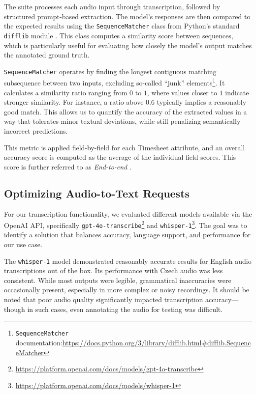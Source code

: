 \documentclass[
  digital,     %
  oneside,     %
  nosansbold,  %
  nocolorbold, %
  lof,         %
  lot,         %
]{fithesis4}
\begin{document}
The suite processes each audio input through transcription, followed by structured prompt-based extraction. The model's responses are then compared to the expected results using the \texttt{SequenceMatcher} class from Python’s standard \texttt{difflib} module \cite{pythonDifflib}. This class computes a similarity score between sequences, which is particularly useful for evaluating how closely the model's output matches the annotated ground truth.

\texttt{SequenceMatcher} operates by finding the longest contiguous matching subsequence between two inputs, excluding so-called ``junk'' elements\footnote{\texttt{SequenceMatcher} documentation:\newline\url{https://docs.python.org/3/library/difflib.html\#difflib.SequenceMatcher}}. It calculates a similarity ratio ranging from $0$ to $1$, where values closer to $1$ indicate stronger similarity. For instance, a ratio above $0.6$ typically implies a reasonably good match. This allows us to quantify the accuracy of the extracted values in a way that tolerates minor textual deviations, while still penalizing semantically incorrect predictions.

This metric is applied field-by-field for each Timesheet attribute, and an overall accuracy score is computed as the average of the individual field scores. This score is further referred to as \emph{End-to-end }.

\subsection{Optimizing Audio-to-Text Requests}
For our transcription functionality, we evaluated different models available via the OpenAI \gls{API}, specifically \texttt{gpt-4o-transcribe}\footnote{\url{https://platform.openai.com/docs/models/gpt-4o-transcribe}} and \texttt{whisper-1}\footnote{\url{https://platform.openai.com/docs/models/whisper-1}}. The goal was to identify a solution that balances accuracy, language support, and performance for our use case.

The \texttt{whisper-1} model demonstrated reasonably accurate results for English audio transcriptions out of the box. Its performance with Czech audio was less consistent. While most outputs were legible, grammatical inaccuracies were occasionally present, especially in more complex or noisy recordings. It should be noted that poor audio quality significantly impacted transcription accuracy—though in such cases, even annotating the audio for testing was difficult.
\end{document}
